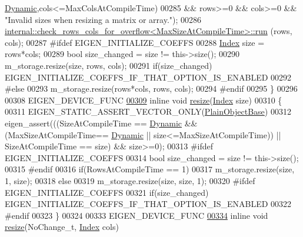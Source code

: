 \begin{DoxyCode}
      \hyperlink{namespace_eigen_ad81fa7195215a0ce30017dfac309f0b2}{Dynamic},cols<=MaxColsAtCompileTime)
00285                    && rows>=0 && cols>=0 && \textcolor{stringliteral}{"Invalid sizes when resizing a matrix or array."});
00286       \hyperlink{struct_eigen_1_1internal_1_1check__rows__cols__for__overflow}{internal::check\_rows\_cols\_for\_overflow<MaxSizeAtCompileTime>::run}
      (rows, cols);
00287 \textcolor{preprocessor}{      #ifdef EIGEN\_INITIALIZE\_COEFFS}
00288         \hyperlink{namespace_eigen_a62e77e0933482dafde8fe197d9a2cfde}{Index} size = rows*cols;
00289         \textcolor{keywordtype}{bool} size\_changed = size != this->size();
00290         m\_storage.resize(size, rows, cols);
00291         \textcolor{keywordflow}{if}(size\_changed) EIGEN\_INITIALIZE\_COEFFS\_IF\_THAT\_OPTION\_IS\_ENABLED
00292 \textcolor{preprocessor}{      #else}
00293         m\_storage.resize(rows*cols, rows, cols);
00294 \textcolor{preprocessor}{      #endif}
00295     \}
00296 
00308     EIGEN\_DEVICE\_FUNC
\hyperlink{class_eigen_1_1_plain_object_base_abf8a9ec07cd52a2cdabb527596f7ddd1}{00309}     \textcolor{keyword}{inline} \textcolor{keywordtype}{void} \hyperlink{class_eigen_1_1_plain_object_base_abf8a9ec07cd52a2cdabb527596f7ddd1}{resize}(\hyperlink{namespace_eigen_a62e77e0933482dafde8fe197d9a2cfde}{Index} size)
00310     \{
00311       EIGEN\_STATIC\_ASSERT\_VECTOR\_ONLY(\hyperlink{class_eigen_1_1_plain_object_base}{PlainObjectBase})
00312       eigen\_assert(((SizeAtCompileTime == \hyperlink{namespace_eigen_ad81fa7195215a0ce30017dfac309f0b2}{Dynamic} && (MaxSizeAtCompileTime==
      \hyperlink{namespace_eigen_ad81fa7195215a0ce30017dfac309f0b2}{Dynamic} || size<=MaxSizeAtCompileTime)) || SizeAtCompileTime == size) && size>=0);
00313 \textcolor{preprocessor}{      #ifdef EIGEN\_INITIALIZE\_COEFFS}
00314         \textcolor{keywordtype}{bool} size\_changed = size != this->size();
00315 \textcolor{preprocessor}{      #endif}
00316       \textcolor{keywordflow}{if}(RowsAtCompileTime == 1)
00317         m\_storage.resize(size, 1, size);
00318       \textcolor{keywordflow}{else}
00319         m\_storage.resize(size, size, 1);
00320 \textcolor{preprocessor}{      #ifdef EIGEN\_INITIALIZE\_COEFFS}
00321         \textcolor{keywordflow}{if}(size\_changed) EIGEN\_INITIALIZE\_COEFFS\_IF\_THAT\_OPTION\_IS\_ENABLED
00322 \textcolor{preprocessor}{      #endif}
00323     \}
00324 
00333     EIGEN\_DEVICE\_FUNC
\hyperlink{class_eigen_1_1_plain_object_base_ab71a655f73d05a0e389e3ed13b6fe5f3}{00334}     \textcolor{keyword}{inline} \textcolor{keywordtype}{void} \hyperlink{class_eigen_1_1_plain_object_base_ab71a655f73d05a0e389e3ed13b6fe5f3}{resize}(NoChange\_t, \hyperlink{namespace_eigen_a62e77e0933482dafde8fe197d9a2cfde}{Index} cols)

\end{DoxyCode}
